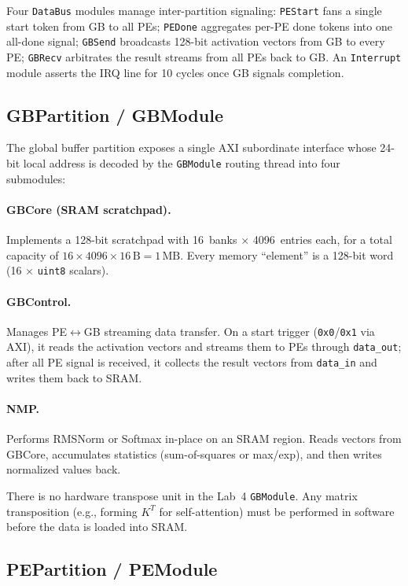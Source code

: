 \documentclass[11pt]{article}
\begin{document}
Four \texttt{DataBus} modules manage inter-partition signaling:
\texttt{PEStart} fans a single start token from GB to all PEs;
\texttt{PEDone} aggregates per-PE done tokens into one all-done signal;
\texttt{GBSend} broadcasts 128-bit activation vectors from GB to every PE;
\texttt{GBRecv} arbitrates the result streams from all PEs back to GB. An
\texttt{Interrupt} module asserts the IRQ line for 10 cycles once GB signals
completion.

\subsection{GBPartition / GBModule}

The global buffer partition exposes a single AXI subordinate interface whose
24-bit local address is decoded by the \texttt{GBModule} routing thread into
four submodules:

\paragraph{GBCore (SRAM scratchpad).}
Implements a 128-bit scratchpad with 16~banks $\times$ 4096~entries each,
for a total capacity of $16 \times 4096 \times 16\,\text{B} = 1\,\text{MB}$.
Every memory ``element'' is a 128-bit word (16 $\times$ \texttt{uint8}
scalars). 

\paragraph{GBControl.}
Manages PE$\leftrightarrow$GB streaming data transfer. On a start trigger
(\texttt{0x0}/\texttt{0x1} via AXI), it reads the activation vectors 
and streams them to PEs through \texttt{data\_out}; after all PE signal is received, it collects the result vectors from \texttt{data\_in} and writes them back to SRAM.

\paragraph{NMP.}
Performs RMSNorm or Softmax in-place on an SRAM region. Reads vectors from
GBCore, accumulates statistics (sum-of-squares or max/exp), and then writes
normalized values back. 

There is no hardware transpose unit in the Lab~4 \texttt{GBModule}. Any matrix transposition (e.g., forming $K^T$ for self-attention) must be performed in software before the data is loaded into SRAM.

\subsection{PEPartition / PEModule}
\end{document}

